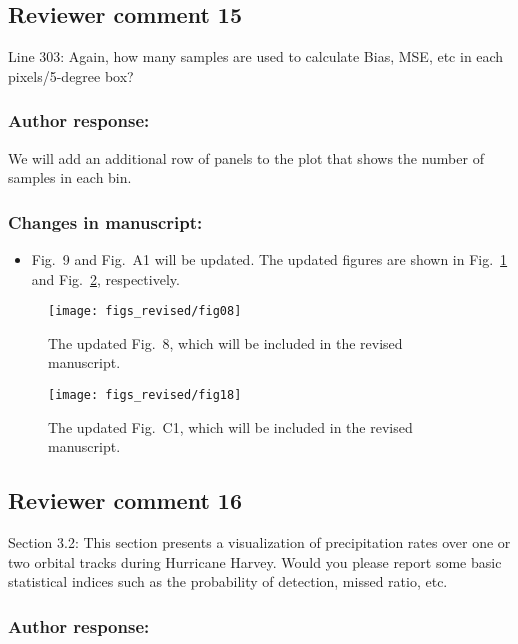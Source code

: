 \subsection*{Reviewer comment 15}

Line 303: Again, how many samples are used to calculate Bias, MSE, etc in each
pixels/5-degree box?

\subsubsection*{Author response:}

We will add an additional row of panels to the plot that shows the number of samples
in each bin.

\subsubsection*{Changes in manuscript:}

\begin{itemize}
  \item Fig.~9 and Fig.~A1 will be updated. The updated figures are shown
    in Fig.~\ref{fig:results_spatial_gmi} and Fig.~\ref{fig:results_spatial_mhs}, respectively.
\end{itemize}

\begin{figure}[hbpt]
  \centering
  \texttt{[image: figs\_revised/fig08]}
  \caption{
    The updated Fig.~8, which will be included in the revised manuscript.
  }
  \label{fig:results_spatial_gmi}
\end{figure}

\begin{figure}[hbpt]
  \centering
  \texttt{[image: figs\_revised/fig18]}
  \caption{
    The updated Fig.~C1, which will be included in the revised manuscript.
  }
  \label{fig:results_spatial_mhs}
\end{figure}

\subsection*{Reviewer comment 16}

Section 3.2: This section presents a visualization of precipitation rates over one or two orbital
tracks during Hurricane Harvey. Would you please report some basic statistical indices such as the
probability of detection, missed ratio, etc.

\subsubsection*{Author response:}

